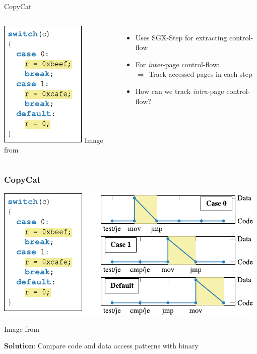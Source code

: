 \documentclass{beamer}
\begin{document}
\begin{frame}{CopyCat}

    \begin{columns}
        \includegraphics[]{copy-cat-switch-example-only-code.pdf}
        {\tiny\color{gray}Image from \cite{MoghimiBHPS20}}
        
        \begin{itemize}
            \item Uses SGX-Step for extracting control-flow
            \item For \emph{inter}-page control-flow: \\ $\Rightarrow$ Track accessed pages in each step
            \item How can we track \emph{intra}-page control-flow?
        \end{itemize}
    
    \end{columns}
\end{frame}

\begin{frame}
    \frametitle{CopyCat}

    \begin{center}
        \includegraphics{copy-cat-switch-example.pdf}
    \end{center}

    {\hfill\tiny\color{gray}Image from \cite{MoghimiBHPS20}}
    
    \textbf{Solution}: Compare code and data access patterns with binary
\end{frame}
\end{document}
